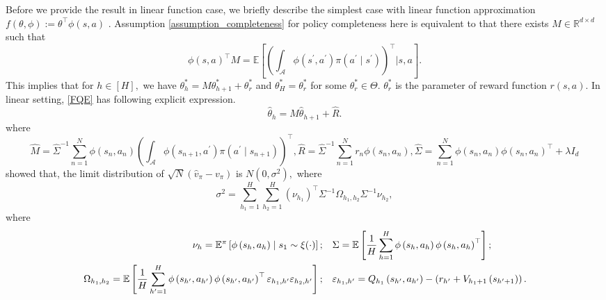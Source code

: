 \documentclass{article}
\numberwithin{equation}{section}
\theoremstyle{plain}
\theoremstyle{definition}
\theoremstyle{remark}
\begin{document}
Before we provide the result in linear function case, we briefly describe the simplest case with linear function approximation $f(\theta,\phi) := \theta^{\top}\phi(s,a)$ \citep{bootstrap}. Assumption \ref{assumption_completeness} for policy completeness here is equivalent to that there exists $M \in \mathbb{R}^{d \times d}$ such that
$$
\phi(s, a)^{\top} M =\mathbb{E}\left[\left(\int_{\mathcal{A}} \phi(s^{\prime},a^{\prime}) \pi(a^{\prime}\mid s^{\prime})\right)^{\top} \bigg| s, a\right].
$$
This implies that for $h \in [H],$ we have $\theta_h^* = M \theta_{h+1}^* + \theta_r^*$ and $\theta_H^* = \theta_r^*$ for some $\theta_r^* \in \Theta.$ $\theta_r^*$ is the parameter of reward function $r(s,a).$ In linear setting, \eqref{FQE} has following explicit expression.
\begin{equation}\label{special_case1}
    \widehat{\theta}_h = \widehat{M} \widehat{\theta}_{h+1} + \widehat{R}.
\end{equation}
where
$$
\widehat{M}=\widehat{\Sigma}^{-1} \sum_{n=1}^{N} \phi\left(s_{n}, a_{n}\right) \left(\int_{\mathcal{A}} \phi(s_{n+1},a^{\prime}) \pi(a^{\prime}\mid s_{n+1})\right)^{\top}, \widehat{R}=\widehat{\Sigma}^{-1} \sum_{n=1}^{N} r_{n} \phi\left(s_{n}, a_{n}\right), \widehat{\Sigma}=\sum_{n=1}^{N} \phi\left(s_{n}, a_{n}\right) \phi\left(s_{n}, a_{n}\right)^{\top}+\lambda I_{d}
$$
\cite{bootstrap} showed that, the limit distribution of $\sqrt{N}\left(\widehat{v}_{\pi} - v_{\pi}\right)$ is $N(0,\sigma^2),$ where 
\begin{equation}\label{variance_linear_case}
    \sigma^{2}=\sum_{h_1=1}^{H} \sum_{h_2=1}^{H} \left(\nu_{h_1}\right)^{\top} \Sigma^{-1} \Omega_{h_1, h_2} \Sigma^{-1} \nu_{h_2},
\end{equation}
where
\begin{align}
    \nu_{h} = \mathbb{E}^{\pi}\left[\phi\left(s_{h}, a_{h}\right) \mid s_{1} \sim \xi(\cdot)\right]; & \quad \Sigma=\mathbb{E}\left[\frac{1}{H} \sum_{h=1}^{H} \phi\left(s_{h}, a_{h}\right) \phi\left(s_{h}, a_{h}\right)^{\top}\right]; \notag \\
    \Omega_{h_{1}, h_{2}}=\mathbb{E}\left[\frac{1}{H} \sum_{h^{\prime}=1}^{H} \phi\left(s_{h^{\prime}}, a_{h^{\prime}}\right) \phi\left(s_{h^{\prime}}, a_{h^{\prime}}\right)^{\top} \varepsilon_{h_{1}, h^{\prime}} \varepsilon_{h_{2}, h^{\prime}}\right]; & \quad \varepsilon_{h_{1}, h^{\prime}}=Q_{h_{1}}\left(s_{h^{\prime}}, a_{h^{\prime}}\right)-\left(r_{h^{\prime}}+V_{h_{1}+1}\left(s_{h^{\prime}+1}\right)\right). \label{definitions_linear_case}
\end{align}
\end{document}
